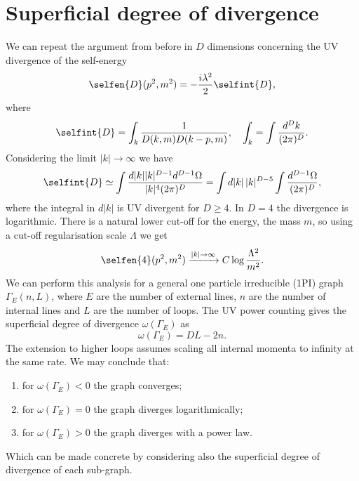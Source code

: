 \section{Superficial degree of divergence}
We can repeat the argument from before in $D$ dimensions concerning the UV divergence of the self-energy 
\begin{equation}
\label{eq: definition of the UV divergence of the self-energy}
    \selfen{D}(p^2,m^2) = -\frac{i\lambda^2}{2}\selfint{D},
\end{equation}
where
\begin{equation}
    \selfint{D} = \int_k \frac{1}{D(k,m)D(k - p,m)},\quad \int_k = \int\frac{d^Dk}{(2\pi)^D}.
\end{equation}
Considering the limit $|k| \to \infty$ we have
\begin{equation}
    \selfint{D} \simeq \int \frac{d|k||k|^{D-1}d^{D-1}\Omega}{|k|^4(2\pi)^D} = \int d|k|\,|k|^{D - 5}\int \frac{d^{D-1}\Omega}{(2\pi)^D},
\end{equation}
where the integral in $d|k|$ is UV divergent for $D \ge 4$. In $D = 4$ the divergence is logarithmic. There is a natural lower cut-off for the energy, the mass $m$, so using a cut-off regularisation scale $\Lambda$ we get
\begin{equation}
    \selfen{4}(p^2,m^2) \xrightarrow{|k| \to \infty} C\log{\frac{\Lambda^2}{m^2}}.
\end{equation}
We can perform this analysis for a general one particle irreducible (1PI) graph $\Gamma_E(n,L)$, where $E$ are the number of external lines, $n$ are the number of internal lines and $L$ are the number of loops. The UV power counting gives the superficial degree of divergence $\omega(\Gamma_E)$ as 
\begin{equation}
\label{eq: superficial degree of divergence}
    \omega(\Gamma_E) = DL - 2n.
\end{equation}
The extension to higher loops assumes scaling all internal momenta to infinity at the same rate. We may conclude that:
\begin{enumerate}
    \item for $\omega(\Gamma_E) < 0$ the graph converges;
    \item for $\omega(\Gamma_E) = 0$ the graph diverges logarithmically;
    \item for $\omega(\Gamma_E) > 0$ the graph diverges with a power law.
\end{enumerate}
Which can be made concrete by considering also the superficial degree of divergence of each sub-graph.
